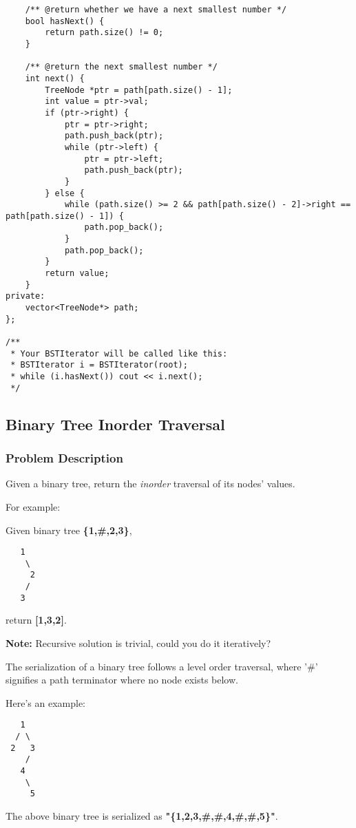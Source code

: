 \documentclass[courier]{article}
\begin{document}
\begin{CJK*}{UTF8}{gkai}
\begin{lstlisting}
    /** @return whether we have a next smallest number */
    bool hasNext() {
        return path.size() != 0;
    }
    
    /** @return the next smallest number */
    int next() {
        TreeNode *ptr = path[path.size() - 1];
        int value = ptr->val;
        if (ptr->right) {
            ptr = ptr->right;
            path.push_back(ptr);
            while (ptr->left) {
                ptr = ptr->left;
                path.push_back(ptr);
            }
        } else {
            while (path.size() >= 2 && path[path.size() - 2]->right == path[path.size() - 1]) {
                path.pop_back();
            }
            path.pop_back();
        }
        return value;
    }
private:
    vector<TreeNode*> path;
};

/**
 * Your BSTIterator will be called like this:
 * BSTIterator i = BSTIterator(root);
 * while (i.hasNext()) cout << i.next();
 */

\end{lstlisting}


\subsection{ Binary Tree Inorder Traversal }

\subsubsection*{Problem Description}
Given a binary tree, return the \emph{inorder} traversal of its nodes' values.

For example:


Given binary tree \textbf{\{1,\#,2,3\}},


\begin{verbatim}
   1
    \
     2
    /
   3
\end{verbatim}

return \textbf{[1,3,2]}.

\textbf{Note:} Recursive solution is trivial, could you do it iteratively?

The serialization of a binary tree follows a level order traversal, where '\#' signifies a path terminator where no node exists below.

Here's an example:


\begin{verbatim}
   1
  / \
 2   3
    /
   4
    \
     5
\end{verbatim}
The above binary tree is serialized as \textbf{"\{1,2,3,\#,\#,4,\#,\#,5\}"}.




\end{CJK*}
\end{document}
